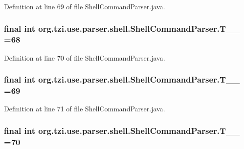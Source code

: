 Definition at line 69 of file Shell\-Command\-Parser.\-java.

\hypertarget{classorg_1_1tzi_1_1use_1_1parser_1_1shell_1_1_shell_command_parser_afd22ab9f833181342cc519ef22f6024e}{
\subsubsection[{T\-\_\-\-\_\-68}]{\setlength{\rightskip}{0pt plus 5cm}final int org.\-tzi.\-use.\-parser.\-shell.\-Shell\-Command\-Parser.\-T\-\_\-\-\_ =68\hspace{0.3cm}{\ttfamily [static]}}}\label{classorg_1_1tzi_1_1use_1_1parser_1_1shell_1_1_shell_command_parser_afd22ab9f833181342cc519ef22f6024e}


Definition at line 70 of file Shell\-Command\-Parser.\-java.

\hypertarget{classorg_1_1tzi_1_1use_1_1parser_1_1shell_1_1_shell_command_parser_a05c86633a647cae59006d4ab9f2685ff}{
\subsubsection[{T\-\_\-\-\_\-69}]{\setlength{\rightskip}{0pt plus 5cm}final int org.\-tzi.\-use.\-parser.\-shell.\-Shell\-Command\-Parser.\-T\-\_\-\-\_ =69\hspace{0.3cm}{\ttfamily [static]}}}\label{classorg_1_1tzi_1_1use_1_1parser_1_1shell_1_1_shell_command_parser_a05c86633a647cae59006d4ab9f2685ff}


Definition at line 71 of file Shell\-Command\-Parser.\-java.

\hypertarget{classorg_1_1tzi_1_1use_1_1parser_1_1shell_1_1_shell_command_parser_a5793a9a9e6dcad13c2f42344649be8a7}{
\subsubsection[{T\-\_\-\-\_\-70}]{\setlength{\rightskip}{0pt plus 5cm}final int org.\-tzi.\-use.\-parser.\-shell.\-Shell\-Command\-Parser.\-T\-\_\-\-\_ =70\hspace{0.3cm}{\ttfamily [static]}}}\label{classorg_1_1tzi_1_1use_1_1parser_1_1shell_1_1_shell_command_parser_a5793a9a9e6dcad13c2f42344649be8a7}


